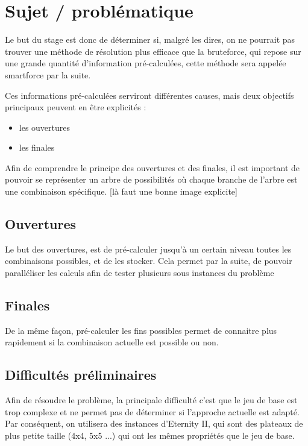 \documentclass{article}
\begin{document}
	\section{Sujet / problématique}
	
	Le but du stage est donc de déterminer si, malgré les dires, on ne pourrait pas trouver une méthode de résolution plus efficace que la bruteforce, qui repose sur une grande quantité d'information pré-calculées, cette méthode sera appelée smartforce par la suite.
	
	Ces informations pré-calculées serviront différentes causes, mais deux objectifs principaux peuvent en être explicités :
	
	\begin{itemize}
		\item les ouvertures
		\item les finales
	\end{itemize}
	
	Afin de comprendre le principe des ouvertures et des finales, il est important de pouvoir se représenter un arbre de possibilités où chaque branche de l'arbre est une combinaison spécifique. [là faut une bonne image explicite]
	
	\subsection{Ouvertures}
	
	Le but des ouvertures, est de pré-calculer jusqu'à un certain niveau toutes les combinaisons possibles, et de les stocker. Cela permet par la suite, de pouvoir paralléliser les calculs afin de tester plusieurs sous instances du problème
	
	\subsection{Finales}
	
	De la même façon, pré-calculer les fins possibles permet de connaitre plus rapidement si la combinaison actuelle est possible ou non.
	
	
	\subsection{Difficultés préliminaires}
	
	Afin de résoudre le problème, la principale difficulté c'est que le jeu de base est trop complexe et ne permet pas de déterminer si l'approche actuelle est adapté. Par conséquent, on utilisera des instances d'Eternity II, qui sont des plateaux de plus petite taille (4x4, 5x5 ...) qui ont les mêmes propriétés que le jeu de base.
	
\end{document}
